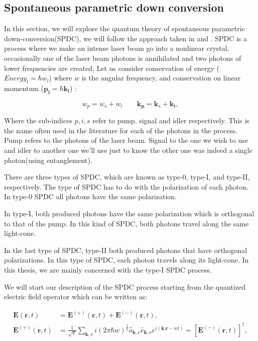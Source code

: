 \documentclass[12pt]{book}
\begin{document}
\subsection{Spontaneous parametric down conversion}

In this section, we will explore the quantum theory of spontaneous parametric down-conversion(SPDC), we will follow the approach taken in \cite{procopio} and \cite{multiphoton}. SPDC is a process where we make an intense laser beam go into a nonlinear crystal, occasionally one of the laser beam photons is annihilated and two photons of lower frequencies are created, Let us consider conservation of energy ($Energy_{l}=\hbar w_{l}$) where $w$ is the angular frequency, and conservation on linear momentum ($\mathbf{p_{l}}=\hbar \mathbf{k_{l}}$) :

\begin{equation}
w_{p}=w_{s}+w_{i} \qquad \mathbf{k_{p}}=\mathbf{k}_{s}+\mathbf{k_{i}},
\end{equation}

Where the sub-indices $p, i,s$ refer to pump, signal and idler respectively. This is the name often used in the literature for each of the photons in the process. Pump refers to the photons of the laser beam. Signal to the one we wish to use and idler to another one we'll use just to know the other one was indeed a single photon(using entanglement).

There are three types of SPDC, which are known as type-0, type-I, and type-II, respectively. The type of SPDC has to do with the polarization of each photon. In type-0 SPDC all photons have the same polarization.

In type-I, both produced photons have the same polarization which is orthogonal to that of the pump. In this kind of SPDC, both photons travel along the same light-cone.

In the last type of SPDC, type-II both produced photons that have orthogonal polarizations. In this type of SPDC, each photon travels along its light-cone. In this thesis, we are mainly concerned with the type-I SPDC process.

We will start our description of the SPDC process starting from the quantized electric field operator which can be written as:

\begin{align}
\textbf{E}(\textbf{r},t)&=\textbf{E}^{(+)} (\textbf{r},t) + \textbf{E}^{(-)} (\textbf{r},t),\\
\textbf{E}^{(+)} (\textbf{r},t)&=\frac{1}{\sqrt{V}} \sum_{\textbf{k},\nu} i(2 \pi \hbar w)^{\frac{1}{2}} \hat{a}_{\textbf{k},\nu} \hat{e}_{\textbf{k},\nu} e^{i(\textbf{k.r}-wt)}=[\textbf{E}^{(-)} (\textbf{r},t)]^{\dagger},
\end{align}
\end{document}
